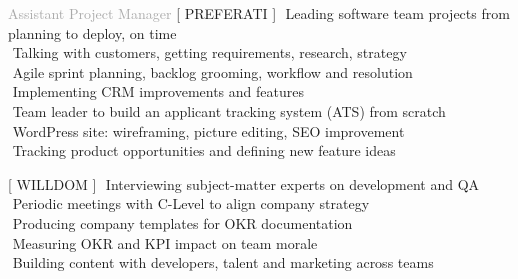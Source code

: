 
    
\begin{cvtable}

\bigskip

{\textcolor{darkgray}{Assistant Project Manager}}%
{[ {P\scriptsize REFERATI} ]}%
{%
     \textperiodcentered $ $ Leading software team projects from planning to deploy, on time \\
     \textperiodcentered $ $ %
     Talking with customers, 
     getting requirements, research, strategy \\
     \textperiodcentered $ $ Agile sprint planning, backlog grooming, workflow and resolution \\
     \textperiodcentered $ $ Implementing CRM improvements and features \\
     \textperiodcentered $ $ Team leader to build an applicant tracking system (ATS) from scratch \\
     \textperiodcentered $ $ WordPress site: wireframing, picture editing, SEO improvement \\
     \textperiodcentered $ $ Tracking product opportunities and defining new feature ideas %
} %
 
\bigskip
 
{\textcolor{darkgray}{
    }}%
{[ {W\scriptsize ILL}{D\scriptsize OM} ]}%
{%
    \textperiodcentered $ $ Interviewing subject-matter experts on development and QA \\
    \textperiodcentered $ $ Periodic meetings with C-Level to align company strategy  \\
    \textperiodcentered $ $ Producing company templates for OKR documentation \\
    \textperiodcentered $ $ Measuring OKR and KPI impact on team morale \\
    \textperiodcentered $ $ Building content with developers, talent and marketing across teams \\
} 


\end{cvtable}
